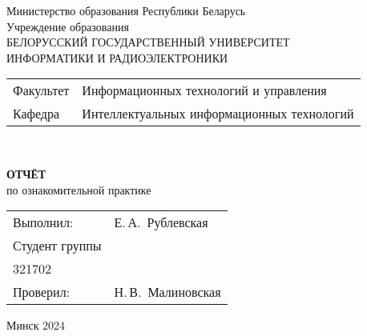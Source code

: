 \begin{titlepage}
  \begin{center}
    Министерство образования Республики Беларусь\\[1em]
    Учреждение образования\\
    БЕЛОРУССКИЙ ГОСУДАРСТВЕННЫЙ УНИВЕРСИТЕТ \\
    ИНФОРМАТИКИ И РАДИОЭЛЕКТРОНИКИ\\[1em]

    \begin{minipage}{\textwidth}
      \begin{flushleft}
        \begin{tabular}{ l l }
          Факультет & Информационных технологий и управления\\
          Кафедра   & Интеллектуальных информационных технологий
        \end{tabular}
      \end{flushleft}
    \end{minipage}\\[1em]

    \vspace{5em}


    \textbf{ОТЧЁТ}\\
    
    {по ознакомительной практике}\\
    \vspace{10em}
    
    \begin{tabular}{ p{}p{} }
      Выполнил:& Е.\,А.~Рублевская \\[1em]
      Студент группы& \\
      321702 & \\
      Проверил: & Н.\,В.~Малиновская \\
     
    \end{tabular}
    
    \vfill
    {\normalsize Минск 2024}
  \end{center}
\end{titlepage}
